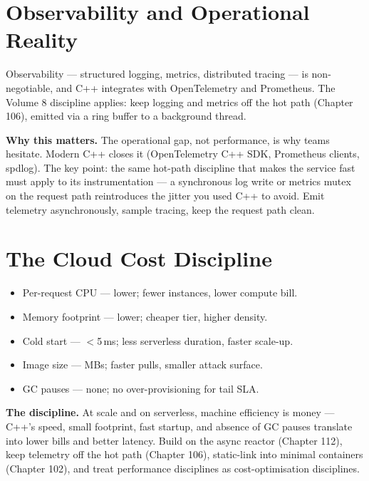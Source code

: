\section{Observability and Operational Reality}
Observability --- structured logging, metrics, distributed tracing --- is non-negotiable, and C++ integrates with OpenTelemetry and Prometheus. The Volume 8 discipline applies: keep logging and metrics off the hot path (Chapter 106), emitted via a ring buffer to a background thread.

\textbf{Why this matters.} The operational gap, not performance, is why teams hesitate. Modern C++ closes it (OpenTelemetry C++ SDK, Prometheus clients, spdlog). The key point: the same hot-path discipline that makes the service fast must apply to its instrumentation --- a synchronous log write or metrics mutex on the request path reintroduces the jitter you used C++ to avoid. Emit telemetry asynchronously, sample tracing, keep the request path clean.

\section{The Cloud Cost Discipline}
\begin{itemize}
\item Per-request CPU --- lower; fewer instances, lower compute bill.
\item Memory footprint --- lower; cheaper tier, higher density.
\item Cold start --- $<$5\,ms; less serverless duration, faster scale-up.
\item Image size --- MBs; faster pulls, smaller attack surface.
\item GC pauses --- none; no over-provisioning for tail SLA.
\end{itemize}

\textbf{The discipline.} At scale and on serverless, machine efficiency is money --- C++'s speed, small footprint, fast startup, and absence of GC pauses translate into lower bills and better latency. Build on the async reactor (Chapter 112), keep telemetry off the hot path (Chapter 106), static-link into minimal containers (Chapter 102), and treat performance disciplines as cost-optimisation disciplines.

